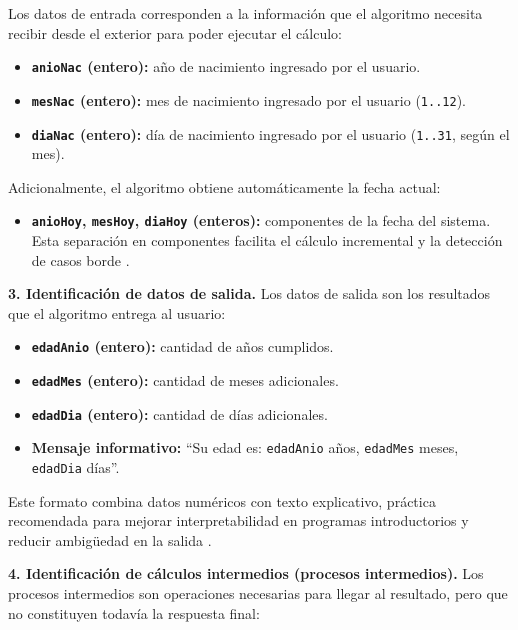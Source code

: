 \documentclass[12pt,twoside]{book}
\begin{document}
						Los datos de entrada corresponden a la información que el algoritmo necesita recibir desde el exterior para poder ejecutar el cálculo:
						
						\begin{itemize}
							\item \textbf{\texttt{anioNac} (entero):} año de nacimiento ingresado por el usuario.
							\item \textbf{\texttt{mesNac} (entero):} mes de nacimiento ingresado por el usuario (\texttt{1..12}).
							\item \textbf{\texttt{diaNac} (entero):} día de nacimiento ingresado por el usuario (\texttt{1..31}, según el mes).
						\end{itemize}
						
						\noindent
						Adicionalmente, el algoritmo obtiene automáticamente la fecha actual:
						\begin{itemize}
							\item \textbf{\texttt{anioHoy}, \texttt{mesHoy}, \texttt{diaHoy} (enteros):} componentes de la fecha del sistema. Esta separación en componentes facilita el cálculo incremental y la detección de casos borde \cite{Sebesta2019Concepts,Pierce2002Types}.
						\end{itemize}
						
						\noindent
						\textbf{3. Identificación de datos de salida.}
						Los datos de salida son los resultados que el algoritmo entrega al usuario:
						
						\begin{itemize}
							\item \textbf{\texttt{edadAnio} (entero):} cantidad de años cumplidos.
							\item \textbf{\texttt{edadMes} (entero):} cantidad de meses adicionales.
							\item \textbf{\texttt{edadDia} (entero):} cantidad de días adicionales.
							\item \textbf{Mensaje informativo:} ``Su edad es: \texttt{edadAnio} años, \texttt{edadMes} meses, \texttt{edadDia} días''.
						\end{itemize}
						
						\noindent
						Este formato combina datos numéricos con texto explicativo, práctica recomendada para mejorar interpretabilidad en programas introductorios y reducir ambigüedad en la salida \cite{Gaddis2022Starting,Farrell2018Programming}.
						
						\noindent
						\textbf{4. Identificación de cálculos intermedios (procesos intermedios).}
						Los procesos intermedios son operaciones necesarias para llegar al resultado, pero que no constituyen todavía la respuesta final:
						
\end{document}
